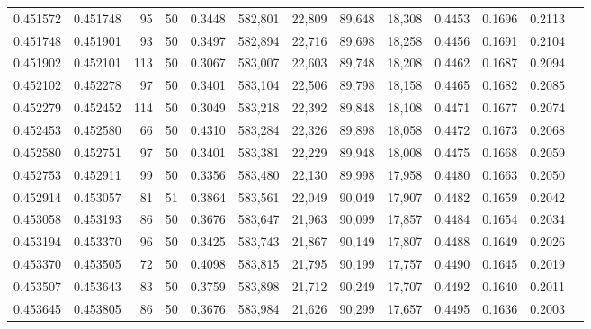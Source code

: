 \begin{tabular}{rrrrrrrrrrrrr}
0.451572 & 0.451748 &    95 &  50 &                                     0.3448 & 582,801 &  22,809 &  89,648 &  18,308 & 0.4453 & 0.1696 & 0.2113 \\
0.451748 & 0.451901 &    93 &  50 &                                     0.3497 & 582,894 &  22,716 &  89,698 &  18,258 & 0.4456 & 0.1691 & 0.2104 \\
0.451902 & 0.452101 &   113 &  50 &                                     0.3067 & 583,007 &  22,603 &  89,748 &  18,208 & 0.4462 & 0.1687 & 0.2094 \\
0.452102 & 0.452278 &    97 &  50 &                                     0.3401 & 583,104 &  22,506 &  89,798 &  18,158 & 0.4465 & 0.1682 & 0.2085 \\
0.452279 & 0.452452 &   114 &  50 &                                     0.3049 & 583,218 &  22,392 &  89,848 &  18,108 & 0.4471 & 0.1677 & 0.2074 \\
0.452453 & 0.452580 &    66 &  50 &                                     0.4310 & 583,284 &  22,326 &  89,898 &  18,058 & 0.4472 & 0.1673 & 0.2068 \\
0.452580 & 0.452751 &    97 &  50 &                                     0.3401 & 583,381 &  22,229 &  89,948 &  18,008 & 0.4475 & 0.1668 & 0.2059 \\
0.452753 & 0.452911 &    99 &  50 &                                     0.3356 & 583,480 &  22,130 &  89,998 &  17,958 & 0.4480 & 0.1663 & 0.2050 \\
0.452914 & 0.453057 &    81 &  51 &                                     0.3864 & 583,561 &  22,049 &  90,049 &  17,907 & 0.4482 & 0.1659 & 0.2042 \\
0.453058 & 0.453193 &    86 &  50 &                                     0.3676 & 583,647 &  21,963 &  90,099 &  17,857 & 0.4484 & 0.1654 & 0.2034 \\
0.453194 & 0.453370 &    96 &  50 &                                     0.3425 & 583,743 &  21,867 &  90,149 &  17,807 & 0.4488 & 0.1649 & 0.2026 \\
0.453370 & 0.453505 &    72 &  50 &                                     0.4098 & 583,815 &  21,795 &  90,199 &  17,757 & 0.4490 & 0.1645 & 0.2019 \\
0.453507 & 0.453643 &    83 &  50 &                                     0.3759 & 583,898 &  21,712 &  90,249 &  17,707 & 0.4492 & 0.1640 & 0.2011 \\
0.453645 & 0.453805 &    86 &  50 &                                     0.3676 & 583,984 &  21,626 &  90,299 &  17,657 & 0.4495 & 0.1636 & 0.2003 \\

\end{tabular}
